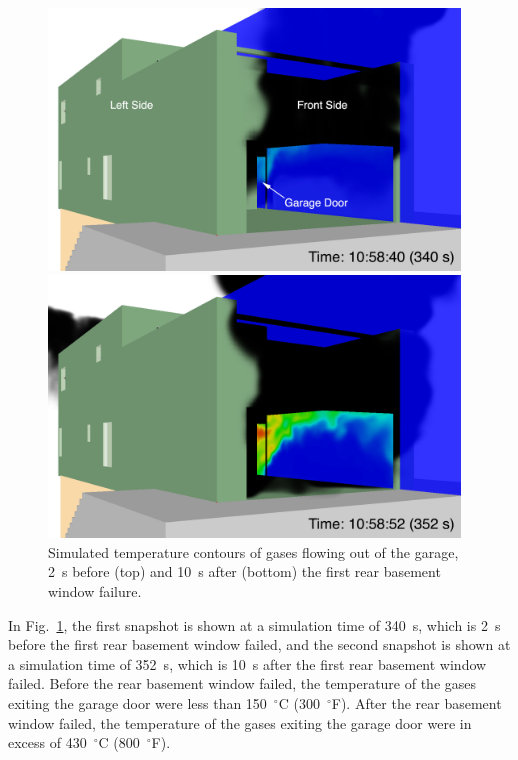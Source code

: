 \documentclass[12pt,oneside]{book}
\begin{document}
\begin{figure}[!ht]
\includegraphics[width=4.3in]{../Figures/SMV_Garage_Temp_340_s}


\includegraphics[width=4.3in]{../Figures/SMV_Garage_Temp_352_s}


\caption[Simulated temperature contours in the garage after basement window failure.]
{Simulated temperature contours of gases flowing out of the garage, 2~s before (top) and 10~s after (bottom) the first rear basement window failure.}
\label{fig:smv_flow_path_garage}
\end{figure}


\clearpage


In Fig.~\ref{fig:smv_flow_path_garage}, the first snapshot is shown at a simulation time of 340~s, which is 2~s before the first rear basement window failed, and the second snapshot is shown at a simulation time of 352~s, which is 10~s after the first rear basement window failed. Before the rear basement window failed, the temperature of the gases exiting the garage door were less than 150~$^{\circ}$C (300~$^{\circ}$F). After the rear basement window failed, the temperature of the gases exiting the garage door were in excess of 430~$^{\circ}$C (800~$^{\circ}$F).
\end{document}
